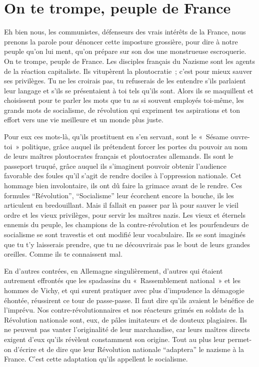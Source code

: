 \documentclass[french,twoside]{book} %
\begin{document}
\section[{On te trompe, peuple de France}]{On te trompe, peuple de France}
\noindent Eh bien nous, les communistes, défenseurs des vrais intérêts de la France, nous prenons la parole pour dénoncer cette imposture grossière, pour dire à notre peuple qu’on lui ment, qu’on prépare sur son dos une monstrueuse escroquerie. On te trompe, peuple de France. Les disciples français du Nazisme sont les agents de la réaction capitaliste. Ils vitupèrent la ploutocratie ; c’est pour mieux sauver ses privilèges. Tu ne les croirais pas, tu refuserais de les entendre s’ils parlaient leur langage et s’ils se présentaient à toi tels qu’ils sont. Alors ils se maquillent et choisissent pour te parler les mots que tu as si souvent employés toi-même, les grands mots de socialisme, de révolution qui expriment tes aspirations et ton effort vers une vie meilleure et un monde plus juste.\par
Pour eux ces mots-là, qu’ils prostituent en s’en servant, sont le « Sésame ouvre-toi » politique, grâce auquel ils prétendent forcer les portes du pouvoir au nom de leurs maîtres ploutocrates français et ploutocrates allemands. Ils sont le passeport truqué, grâce auquel ils s’imaginent pouvoir obtenir l’audience favorable des foules qu’il s’agit de rendre dociles à l’oppression nationale. Cet hommage bien involontaire, ils ont dû faire la grimace avant de le rendre. Ces formules “Révolution”, “Socialisme” leur écorchent encore la bouche, ils les articulent en bredouillant. Mais il fallait en passer par là pour sauver le vieil ordre et les vieux privilèges, pour servir les maîtres nazis. Les vieux et éternels ennemis du peuple, les champions de la contre-révolution et les pourfendeurs de socialisme se sont travestis et ont modifié leur vocabulaire. Ils se sont imaginés que tu t’y laisserais prendre, que tu ne découvrirais pas le bout de leurs grandes oreilles. Comme ils te connaissent mal.\par
En d’autres contrées, en Allemagne singulièrement, d’autres qui étaient autrement effrontés que les spadassins du « Rassemblement national » et les hommes de Vichy, et qui surent pratiquer avec plus d’impudence la démagogie éhontée, réussirent ce tour de passe-passe. Il faut dire qu’ils avaient le bénéfice de l’imprévu. Nos contre-révolutionnaires et nos réacteurs grimés en soldats de la Révolution nationale sont, eux, de pâles imitateurs et de douteux plagiaires. Ils ne peuvent pas vanter l’originalité de leur marchandise, car leurs maîtres directs exigent d’eux qu’ils révèlent constamment son origine. Tout au plus leur permet-on d’écrire et de dire que leur Révolution nationale “adaptera” le nazisme à la France. C’est cette adaptation qu’ils appellent le socialisme.
\end{document}
